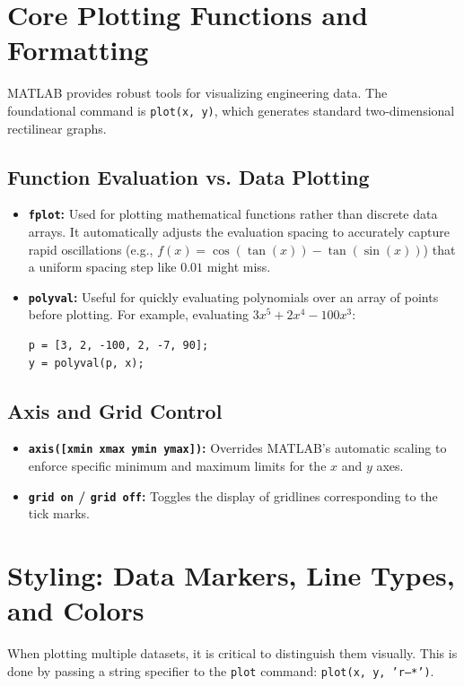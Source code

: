 
\section{Core Plotting Functions and Formatting}
MATLAB provides robust tools for visualizing engineering data. The foundational command is \texttt{plot(x, y)}, which generates standard two-dimensional rectilinear graphs.

\subsection{Function Evaluation vs. Data Plotting}
\begin{itemize}
    \item \textbf{\texttt{fplot}:} Used for plotting mathematical functions rather than discrete data arrays. It automatically adjusts the evaluation spacing to accurately capture rapid oscillations (e.g., $f(x) = \cos(\tan(x)) - \tan(\sin(x))$) that a uniform spacing step like $0.01$ might miss.
    \item \textbf{\texttt{polyval}:} Useful for quickly evaluating polynomials over an array of points before plotting. For example, evaluating $3x^5 + 2x^4 - 100x^3$:
    \begin{lstlisting}
p = [3, 2, -100, 2, -7, 90];
y = polyval(p, x);
    \end{lstlisting}
\end{itemize}

\subsection{Axis and Grid Control}
\begin{itemize}
    \item \textbf{\texttt{axis([xmin xmax ymin ymax])}:} Overrides MATLAB's automatic scaling to enforce specific minimum and maximum limits for the $x$ and $y$ axes. 
    \item \textbf{\texttt{grid on} / \texttt{grid off}:} Toggles the display of gridlines corresponding to the tick marks.
\end{itemize}

\section{Styling: Data Markers, Line Types, and Colors}
When plotting multiple datasets, it is critical to distinguish them visually. This is done by passing a string specifier to the \texttt{plot} command: \texttt{plot(x, y, 'r--*')}.

